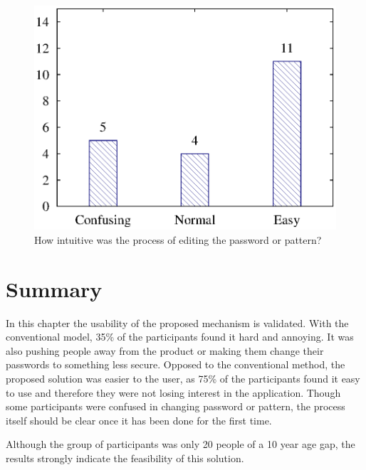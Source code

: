 \begin{figure}[H]
\centering
\includegraphics[scale=.7]{files/question10/question10.eps}
\caption{How intuitive was the process of editing the password or pattern?}
\label{fig:digraph}
\end{figure}

\section{Summary}
In this chapter the usability of the proposed mechanism is validated.  With the conventional model, 35\% of the participants found it hard and annoying. It was also pushing people away from the product or making them change their passwords to something less secure. Opposed to the conventional method, the proposed solution was easier to the user, as 75\% of the participants found it easy to use and therefore they were not losing interest in the application. Though some participants were confused in changing password or pattern, the process itself should be clear once it has been done for the first time. 

Although the group of participants was only 20 people of a 10 year age gap, the results strongly indicate the feasibility of this solution.




